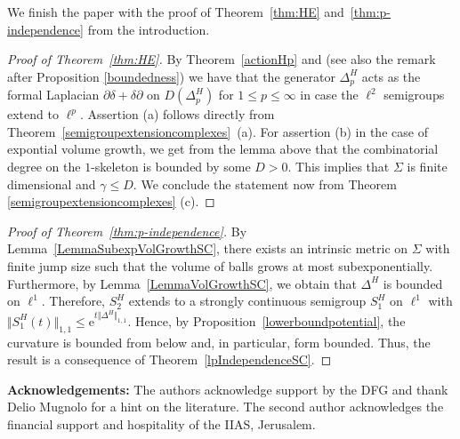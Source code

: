 \documentclass[10pt]{amsart}
\theoremstyle{definition}
\begin{document}
We finish the paper with the proof of Theorem~\ref{thm:HE} and~\ref{thm:p-independence} from the introduction.

\begin{proof}[Proof of Theorem~\ref{thm:HE}]
 By Theorem~\ref{actionHp} and \cite[Theorem 3.12]{BK} (see also the remark after Proposition \ref{boundedness}) we have that the generator $\Delta_p^H$ acts as the formal Laplacian $\partial\delta+\delta\partial$ on $D(\Delta_p^H)$ for $1\leq p\leq \infty$ in case the $\ell^2$ semigroups extend to $\ell^p$. 
Assertion (a) follows directly from  Theorem~\ref{semigroupextensioncomplexes}~(a).
For assertion (b)  in the case of expontial volume growth, we get from the lemma above that the combinatorial degree on the $1$-skeleton is bounded by some $D>0.$ This implies that $\Sigma$ is finite dimensional and $\gamma\leq D.$ We conclude the statement now from Theorem \ref{semigroupextensioncomplexes} (c).
\end{proof}


\begin{proof}[Proof of Theorem~\ref{thm:p-independence}]
By Lemma~\ref{LemmaSubexpVolGrowthSC}, there exists an intrinsic metric on $\Sigma$ with finite jump size such that the volume of balls grows at most subexponentially. Furthermore, by  Lemma~\ref{LemmaVolGrowthSC}, we obtain that $\Delta^H$ is bounded on $\ell^1.$ Therefore,  $S_2^H$ extends to a strongly continuous semigroup $S_1^H$ on $\ell^1$ with $\Vert S_1^H(t)\Vert_{1,1}\leq \mathrm{e}^{t\Vert \Delta^H\Vert_{1,1}}.$ Hence, by Proposition~\ref{lowerboundpotential}, the curvature is bounded from below and, in particular, form bounded. Thus, the result is  a consequence of Theorem~\ref{lpIndependenceSC}.
\end{proof}



{\bf Acknowledgements:} The authors acknowledge support by the DFG and thank Delio Mugnolo for a hint on the literature. The second author acknowledges the financial support and hospitality of the IIAS, Jerusalem.





\end{document}
